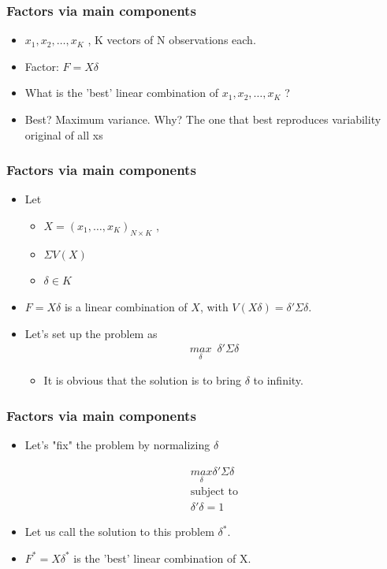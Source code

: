 \documentclass[
  shownotes,
  xcolor={svgnames},
  hyperref={colorlinks,citecolor=DarkBlue,linkcolor=DarkRed,urlcolor=DarkBlue}
  , aspectratio=169]{beamer}
\begin{document}
\begin{frame}
\frametitle{Factors via main components}

\begin{itemize}


\item $x_1, x_2, \dots, x_K$ , K vectors of N observations each.
\medskip
\item Factor: $F = X\delta$
\medskip
\item What is the 'best' linear combination of $x_1, x_2, \dots, x_K$ ?
\medskip
\item Best? Maximum variance. Why? The one that best reproduces variability original of all xs

\end{itemize}
\end{frame}
\begin{frame}
\frametitle{Factors via main components}

\begin{itemize}
  \item Let
  \begin{itemize}
    \item $X = (x_1 , \dots , x_K)_{N \times K}$  , 
    \item $\Sigma V(X)$ 
    \item $\delta \in K$
 \end{itemize}
  \medskip
  \item $F = X\delta$ is a linear combination of $X$, with $V (X\delta) = \delta' \Sigma \delta$.
  \medskip
  \item Let's set up the problem as 
  \begin{align}
  \underset{\delta}{max}\,\,\, \delta' \Sigma \delta
  \end{align}
 \begin{itemize}
  \item It is obvious that the solution is to bring $\delta$ to infinity. 
 \end{itemize}
\end{itemize}
 \end{frame}
\begin{frame}
\frametitle{Factors via main components}

\begin{itemize}
\item Let's "fix" the problem by normalizing $\delta$

\begin{align}
\underset{\delta}{max} \delta' \Sigma \delta \\ \nonumber
\text{subject to}  \\ \nonumber
\delta' \delta = 1 \nonumber
\end{align}
\item Let us call the solution to this problem $\delta^*$. 
\medskip
\item $F^* = X\delta^*$ is the 'best' linear combination of X. 

\end{itemize}
\end{frame}
\end{document}
